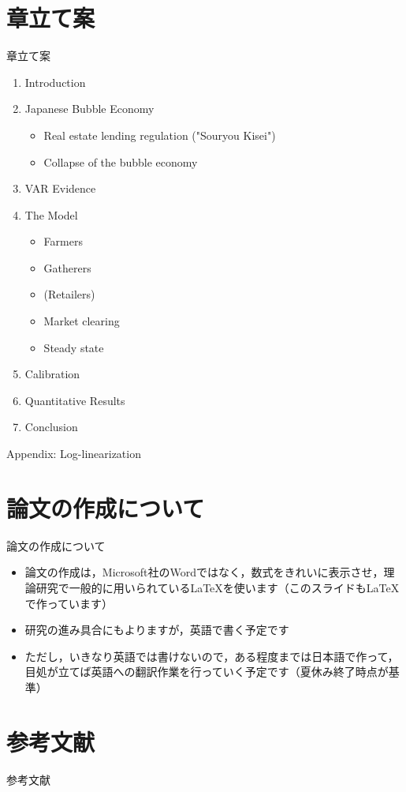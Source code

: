 \documentclass[aspectratio=169, dvipdfmx, 11pt, uplatex]{beamer}
\begin{document}
\section{章立て案}
\begin{frame}{章立て案}
\footnotesize
\begin{enumerate}
  \item Introduction
  \item Japanese Bubble Economy
    \begin{itemize}
      \item Real estate lending regulation ("Souryou Kisei")
      \item Collapse of the bubble economy
    \end{itemize}
  \item VAR Evidence
  \item The Model
    \begin{itemize}
      \item Farmers
      \item Gatherers
      \item (Retailers)
      \item Market clearing
      \item Steady state
    \end{itemize}
  \item Calibration
  \item Quantitative Results
  \item Conclusion
\end{enumerate}
  Appendix: Log-linearization
\end{frame}

\section{論文の作成について}
\begin{frame}{論文の作成について}
  \begin{itemize}
    \item 論文の作成は，Microsoft社のWordではなく，数式をきれいに表示させ，理論研究で一般的に用いられている\LaTeX を使います（このスライドも\LaTeX で作っています）
    \item 研究の進み具合にもよりますが，英語で書く予定です
    \item ただし，いきなり英語では書けないので，ある程度までは日本語で作って，目処が立てば英語への翻訳作業を行っていく予定です（夏休み終了時点が基準）
  \end{itemize}
\end{frame}

\section{参考文献}
\begin{frame}[allowframebreaks]{参考文献}
  \nocite{*}
  \printbibliography
\end{frame}
\end{document}
